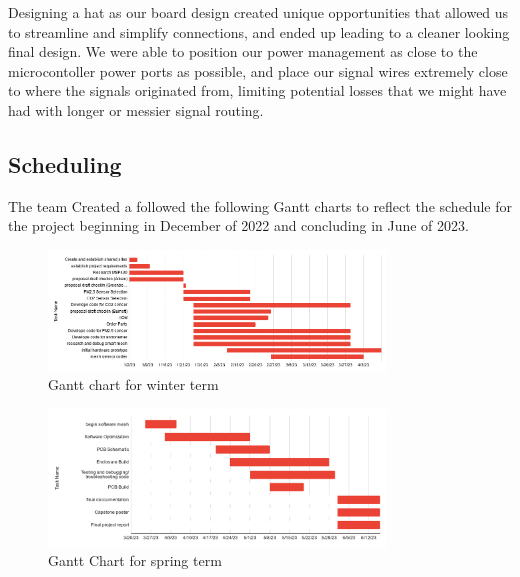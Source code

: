 Designing a hat as our board design created unique opportunities that allowed us to streamline and simplify connections, and ended up leading to a cleaner looking final design. We were able to position our power management as close to the microcontoller power ports as possible, and place our signal wires extremely close to where the signals originated from, limiting potential losses that we might have had with longer or messier signal routing.



\subsection{Scheduling}
The team Created a followed the following Gantt charts to reflect the schedule for the project beginning in December of 2022 and concluding in June of 2023.
\begin{figure}[H]
    \centering
    \includegraphics[width=0.8\textwidth]{Pictures/image (3).png}
    \caption[Gantt chart for winter term]{Gantt chart for winter term} 
    \label{fig:part1commrin}
\end{figure}
\begin{figure}[H]
    \centering
    \includegraphics[width=0.8\textwidth]{Pictures/image (4).png}
    \caption[Gantt Chart for spring term]{Gantt Chart for spring term} 
    \label{fig:part1commrin}
\end{figure}